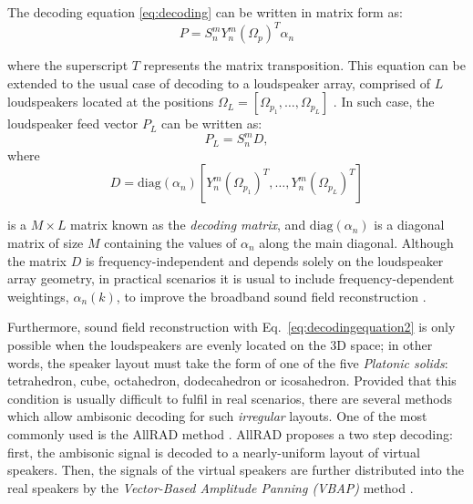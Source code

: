 The decoding equation \ref{eq:decoding} can be written in matrix form as:
\begin{equation}
	P = S_n^m {Y_n^m (\Omega_p)}^T \alpha_n
\label{eq:decodingequation}
\end{equation}

where the superscript $T$ represents the matrix transposition. 
This equation can be extended to the usual case of decoding to a loudspeaker array, comprised of $L$ loudspeakers located at the positions $\Omega_L = [\Omega_{p_1}, \ldots, \Omega_{p_L}]$ . In such case, the loudspeaker feed vector $P_L$ can be written as:
\begin{equation}
	P_L = S_n^m D,
\label{eq:decodingequation2}
\end{equation}
where 
\begin{equation}
	D = \text{diag}(\alpha_n) [{Y_n^{m}(\Omega_{p_1})}^T, \ldots, {Y_n^{m}(\Omega_{p_L})}^T]
\end{equation}

is a $M \times L$ matrix known as the \textit{decoding matrix}, and $\text{diag}(\alpha_n)$ is a diagonal matrix of size $M$ containing the values of $\alpha_n$ along the main diagonal. 
Although the matrix $D$ is frequency-independent and depends solely on the loudspeaker array geometry, in practical scenarios it is usual to include frequency-dependent weightings, $\alpha_n(k)$, to improve the broadband sound field reconstruction \cite{daniel2000representation}.

Furthermore, sound field reconstruction with Eq.~\ref{eq:decodingequation2} is only possible when the loudspeakers are evenly located on the 3D space; in other words, the speaker layout must take the form of one of the five \textit{Platonic solids}: tetrahedron, cube, octahedron, dodecahedron or icosahedron.
Provided that this condition is usually difficult to fulfil in real scenarios, there are several methods which allow ambisonic decoding for such \textit{irregular} layouts. One of the most commonly used is the AllRAD method \cite{zotter2012all}. AllRAD proposes a two step decoding: first, the ambisonic signal is decoded to a nearly-uniform layout of virtual speakers. Then, the signals of the virtual speakers are further distributed into the real speakers by the \textit{Vector-Based Amplitude Panning (VBAP)} method \cite{pulkki1997virtual}.








